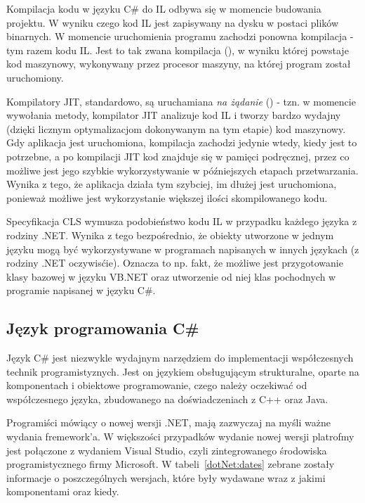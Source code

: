 Kompilacja kodu w języku C\# do IL odbywa się w momencie budowania projektu. W wyniku czego kod IL jest zapisywany na dysku w postaci plików binarnych. W momencie uruchomienia programu zachodzi ponowna kompilacja - tym razem kodu IL. Jest to tak zwana kompilacja  (), w wyniku której powstaje kod maszynowy, wykonywany przez procesor maszyny, na której program został uruchomiony.

Kompilatory JIT, standardowo, są uruchamiana \emph{na żądanie} () - tzn. w momencie wywołania metody, kompilator JIT analizuje kod IL i tworzy bardzo wydajny (dzięki licznym optymalizacjom dokonywanym na tym etapie) kod maszynowy. Gdy aplikacja jest uruchomiona, kompilacja zachodzi jedynie wtedy, kiedy jest to potrzebne, a po kompilacji JIT kod znajduje się w pamięci podręcznej, przez co możliwe jest jego szybkie wykorzystywanie w późniejszych etapach przetwarzania. Wynika z tego, że aplikacja działa tym szybciej, im dłużej jest uruchomiona, ponieważ możliwe jest wykorzystanie większej ilości skompilowanego kodu.

Specyfikacja CLS wymusza podobieństwo kodu IL w przypadku każdego języka z rodziny .NET. Wynika z tego bezpośrednio, że obiekty utworzone w jednym języku mogą być wykorzystywane w programach napisanych w innych językach (z rodziny .NET oczywisćie). Oznacza to np. fakt, że możliwe jest przygotowanie klasy bazowej w języku VB.NET oraz utworzenie od niej klas pochodnych w programie napisanej w języku C\#.

\subsection{Język programowania C\#}
Język C\# jest niezwykle wydajnym narzędziem do implementacji współczesnych technik programistyznych. Jest on językiem obsługującym strukturalne, oparte na komponentach i obiektowe programowanie, czego należy oczekiwać od współczesnego języka, zbudowanego na doświadczeniach z C++ oraz Java. 

Programiści mówiący o nowej wersji .NET, mają zazwyczaj na myśli ważne wydania fremework'a. W większości przypadków wydanie nowej wersji platrofmy jest połączone z wydaniem Visual Studio, czyli zintegrowanego środowiska programistycznego firmy Microsoft. W tabeli~\ref{dotNet:dates} zebrane zostały informacje o poszczególnych wersjach, które były wydawane wraz z jakimi komponentami oraz kiedy.

